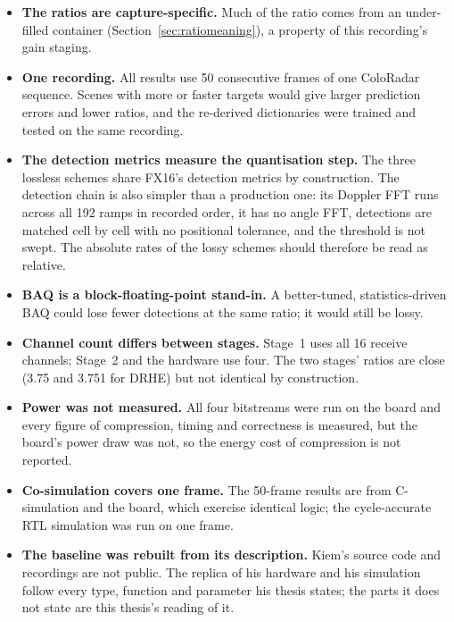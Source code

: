 \begin{itemize}
\item \textbf{The ratios are capture-specific.} Much of the ratio comes from an
under-filled container (Section~\ref{sec:ratiomeaning}), a property of this
recording's gain staging.

\item \textbf{One recording.} All results use 50 consecutive frames of one
ColoRadar sequence. Scenes with more or faster targets would give larger
prediction errors and lower ratios, and the re-derived dictionaries were
trained and tested on the same recording.

\item \textbf{The detection metrics measure the quantisation step.} The three
lossless schemes share FX16's detection metrics by construction. The detection
chain is also simpler than a production one: its Doppler FFT runs across all 192
ramps in recorded order, it has no angle FFT, detections are matched cell by
cell with no positional tolerance, and the threshold is not swept. The
absolute rates of the lossy schemes should therefore be read as relative.

\item \textbf{BAQ is a block-floating-point stand-in.} A better-tuned,
statistics-driven BAQ could lose fewer detections at the same ratio; it would
still be lossy.

\item \textbf{Channel count differs between stages.} Stage~1 uses all 16
receive channels; Stage~2 and the hardware use four. The two stages' ratios are
close (\num{3.75} and \num{3.751} for DRHE) but not identical by construction.

\item \textbf{Power was not measured.} All four bitstreams were run on the
board and every figure of compression, timing and correctness is measured, but
the board's power draw was not, so the energy cost of compression is not
reported.

\item \textbf{Co-simulation covers one frame.} The 50-frame results are from
C-simulation and the board, which exercise identical logic; the cycle-accurate
RTL simulation was run on one frame.

\item \textbf{The baseline was rebuilt from its description.} Kiem's source code
and recordings are not public. The replica of his hardware and his simulation
follow every type, function and parameter his thesis states; the parts it does
not state are this thesis's reading of it.
\end{itemize}
